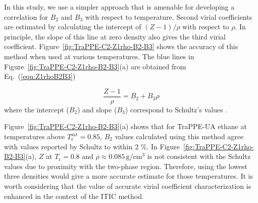 \documentclass[5p,times]{elsarticle}
\begin{document}
In this study, we use a simpler approach that is amenable for developing a correlation for $B_2$ and $B_3$ with respect to temperature. Second virial coefficients are estimated by calculating the intercept of $(Z-1)/\rho$ with respect to $\rho$. In principle, the slope of this line at zero density also gives the third virial coefficient. Figure~\ref{fig:TraPPE-C2-Z1rho-B2-B3} shows the accuracy of this method when used at various temperatures. The blue lines in Figure~\ref{fig:TraPPE-C2-Z1rho-B2-B3}(a) are obtained from Eq.~(\ref{eqn:Z1rhoB2B3})

\begin{equation}
\frac{Z-1}{\rho} = B_2 + B_3\rho \label{eqn:Z1rhoB2B3}
\end{equation}
where the intercept ($B_2$) and slope ($B_3$) correspond to Schultz's values \cite{Schultz2010a}.

Figure~\ref{fig:TraPPE-C2-Z1rho-B2-B3}(a) shows that for TraPPE-UA ethane at temperatures above $T_\mathrm{r}^{\mathrm{sat}}=0.85$, $B_2$ values calculated using this method agree with values reported by Schultz to within 2 \%. In Figure~\ref{fig:TraPPE-C2-Z1rho-B2-B3}(a), $Z$ at $T_\mathrm{r} = 0.8$ and $\rho \approx 0.085\,\mathrm{g/cm^3}$ is not consistent with the Schultz values due to proximity with the two-phase region. Therefore, using the lowest three densities would give a more accurate estimate for those temperatures. It is worth considering that the value of accurate virial coefficient characterization is enhanced in the context of the ITIC method.  
\end{document}
